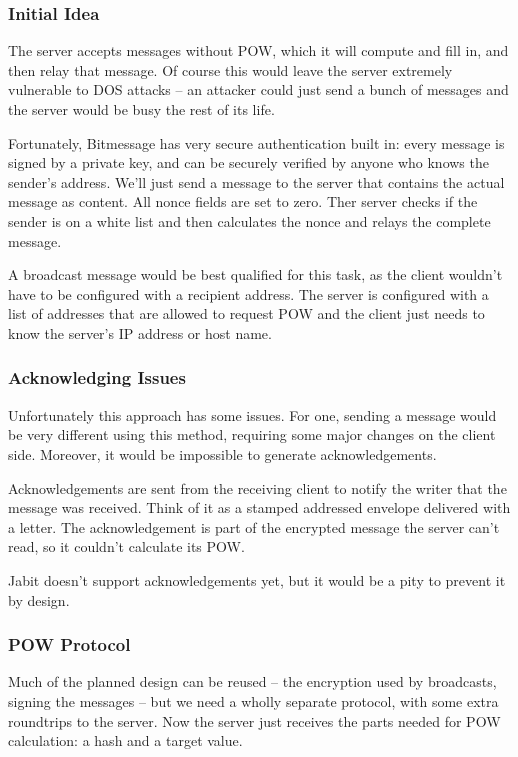 \documentclass{bfh}
\begin{document}
  \subsubsection{Initial Idea}
  The server accepts messages without \ac{POW}, which it will compute and fill in, and then relay that message. Of course this would leave the server extremely vulnerable to \ac{DOS} attacks -- an attacker could just send a bunch of messages and the server would be busy the rest of its life.

  Fortunately, Bitmessage has very secure authentication built in: every message is signed by a private key, and can be securely verified by anyone who knows the sender's address. We'll just send a message to the server that contains the actual message as content. All nonce fields are set to zero. Ther server checks if the sender is on a white list and then calculates the nonce and relays the complete message.

  A broadcast message would be best qualified for this task, as the client wouldn't have to be configured with a recipient address. The server is configured with a list of addresses that are allowed to request \ac{POW} and the client just needs to know the server's IP address or host name.

  \subsubsection{Acknowledging Issues}
  Unfortunately this approach has some issues. For one, sending a message would be very different using this method, requiring some major changes on the client side. Moreover, it would be impossible to generate acknowledgements.

  Acknowledgements are sent from the receiving client to notify the writer that the message was received. Think of it as a stamped addressed envelope delivered with a letter. The acknowledgement is part of the encrypted message the server can't read, so it couldn't calculate its \ac{POW}.

  Jabit doesn't support acknowledgements yet, but it would be a pity to prevent it by design.

  \subsubsection{\ac{POW} Protocol}
  Much of the planned design can be reused -- the encryption used by broadcasts, signing the messages -- but we need a wholly separate protocol, with some extra roundtrips to the server. Now the server just receives the parts needed for \ac{POW} calculation: a hash and a target value.
\end{document}
